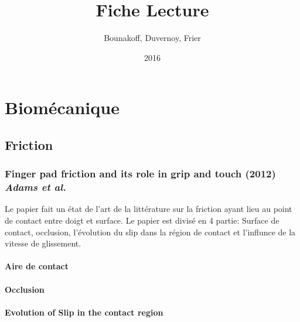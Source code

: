 \documentclass{article}
\title{Fiche Lecture}
\author{Bounakoff, Duvernoy, Frier}
\date{2016}
\begin{document}
	\maketitle
	\section{Biom\'{e}canique}
	\subsection{Friction}
	\subsubsection {Finger pad friction and its role in grip and touch (2012) \textit{Adams et al.} }
	Le papier fait un \'{e}tat de l'art de la litt\'{e}rature sur la friction ayant lieu au point de contact entre doigt et surface.
	Le papier est divis\'{e} en 4 partie: Surface de contact, occlusion, l'\'{e}volution du slip dans la r\'{e}gion de contact et l'influnce de la vitesse de glissement.

	\paragraph {Aire de contact}
	
	\paragraph {Occlusion}
	
	\paragraph {Evolution of Slip in the contact region}
	
\end{document}
